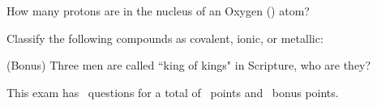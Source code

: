 \documentclass[11pt,addpoints]{exam}   	%
\begin{document}
\begin{questions}
\question[1] How many protons are in the nucleus of an Oxygen () atom?
\vspace{.2in}

\question
Classify the following compounds as covalent, ionic, or metallic:
\vspace{.2in}

\bonusquestion[3]
(Bonus) Three men are called ``king of kings" in Scripture, who are they?

\end{questions}

\vspace{2in}

\begin{center}
This exam has \numquestions\ questions for a total of \numpoints\ points and \numbonuspoints\ bonus points.
\end{center}

\begin{center}
\gradetable[v][questions]
\end{center}
\end{document}
